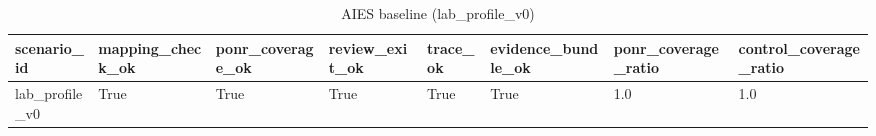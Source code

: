 \begin{table}[t]
\centering
\begin{tabular}{l | l | l | l | l | l | l | l}
\hline
scenario_id & mapping_check_ok & ponr_coverage_ok & review_exit_ok & trace_ok & evidence_bundle_ok & ponr_coverage_ratio & control_coverage_ratio \\
\hline
lab_profile_v0 & True & True & True & True & True & 1.0 & 1.0 \\
\hline
\end{tabular}
\caption{AIES baseline (lab\_profile\_v0)}
\end{table}


